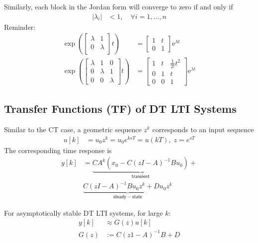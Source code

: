 Similarly, each block in the Jordan form will converge to zero if and only if
\noindent\begin{align*}
    |\lambda_i| & <1,\quad\forall i=1,\ldots,n
\end{align*}
Reminder:
\noindent\begin{align*}
    \left.\exp\left(\begin{bmatrix}\lambda&1\\ 0&\lambda\\\end{bmatrix}\right.t\right)               & =\begin{bmatrix}1&t\\0&1\end{bmatrix}\text{e}^{\lambda t}                          \\
    \left.\exp\left(\begin{bmatrix}\lambda&1&0\\0&\lambda&1\\0&0&\lambda\end{bmatrix}\right.t\right) & =\begin{bmatrix}1&t&\frac{1}{2!}t^2\\0&1&t\\0&0&1\end{bmatrix}\text{e}^{\lambda t}
\end{align*}
%
\subsection{Transfer Functions (TF) of DT LTI Systems}

Similar to the CT case, a geometric sequence $z^k$ corresponds to an input sequence
\noindent\begin{align*}
    u[k] & =u_0z^k=u_0e^{ksT}=u(kT), \; z=e^{sT}
\end{align*}
The corresponding time response is
\noindent\begin{align*}
    y[k] & = \underbrace{CA^k(x_0-C(zI-A)^{-1}Bu_0)}_{\mathsf{transient}}+ \\
    & \underbrace{C(zI-A)^{-1}Bu_0z^k+Du_0z^k}_{\mathsf{steady-state}}
\end{align*}

For asymptotically stable DT LTI systems, for large $k$:
\noindent\begin{align*}
    y[k] & \approx G(z)u[k]  \\
    G(z) & :=C(z1-A)^{-1}B+D
\end{align*}
